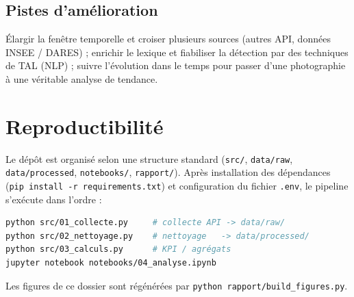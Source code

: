 \documentclass[11pt,a4paper]{article}
\begin{document}
\subsection{Pistes d'amélioration}

Élargir la fenêtre temporelle et croiser plusieurs sources (autres API, données
INSEE / DARES) ; enrichir le lexique et fiabiliser la détection par des techniques
de TAL (NLP) ; suivre l'évolution dans le temps pour passer d'une photographie à
une véritable analyse de tendance.

\appendix
\section{Reproductibilité}

Le dépôt est organisé selon une structure standard (\texttt{src/},
\texttt{data/raw}, \texttt{data/processed}, \texttt{notebooks/},
\texttt{rapport/}). Après installation des dépendances
(\texttt{pip install -r requirements.txt}) et configuration du fichier
\texttt{.env}, le pipeline s'exécute dans l'ordre :

\begin{lstlisting}[language=bash]
python src/01_collecte.py     # collecte API -> data/raw/
python src/02_nettoyage.py    # nettoyage   -> data/processed/
python src/03_calculs.py      # KPI / agrégats
jupyter notebook notebooks/04_analyse.ipynb
\end{lstlisting}

Les figures de ce dossier sont régénérées par
\texttt{python rapport/build\_figures.py}.
\end{document}
